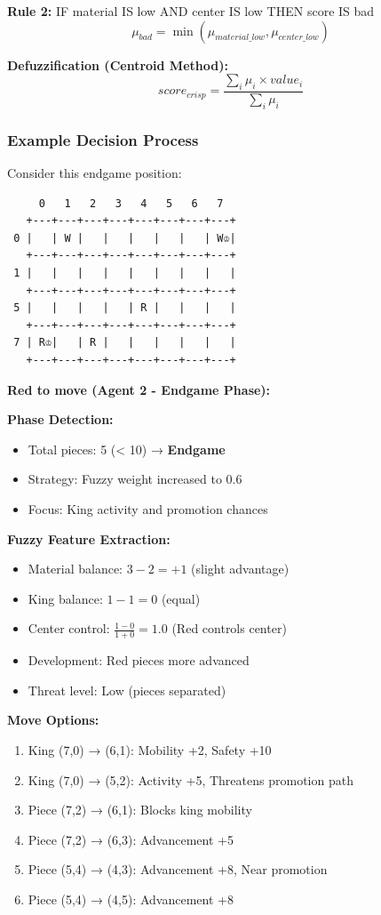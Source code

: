 \documentclass[12pt,a4paper]{article}
\begin{document}
\textbf{Rule 2:} IF material IS low AND center IS low THEN score IS bad
\begin{equation}
\mu_{bad} = \min(\mu_{material\_low}, \mu_{center\_low})
\end{equation}

\textbf{Defuzzification (Centroid Method):}
\begin{equation}
score_{crisp} = \frac{\sum_{i} \mu_i \times value_i}{\sum_{i} \mu_i}
\end{equation}

\subsubsection{Example Decision Process}

Consider this endgame position:

\begin{verbatim}
     0   1   2   3   4   5   6   7
   +---+---+---+---+---+---+---+---+
 0 |   | W |   |   |   |   |   | W♔|
   +---+---+---+---+---+---+---+---+
 1 |   |   |   |   |   |   |   |   |
   +---+---+---+---+---+---+---+---+
 5 |   |   |   |   | R |   |   |   |
   +---+---+---+---+---+---+---+---+
 7 | R♔|   | R |   |   |   |   |   |
   +---+---+---+---+---+---+---+---+
\end{verbatim}

\textbf{Red to move (Agent 2 - Endgame Phase):}

\textbf{Phase Detection:}
\begin{itemize}
    \item Total pieces: 5 (< 10) → \textbf{Endgame}
    \item Strategy: Fuzzy weight increased to 0.6
    \item Focus: King activity and promotion chances
\end{itemize}

\textbf{Fuzzy Feature Extraction:}
\begin{itemize}
    \item Material balance: $3 - 2 = +1$ (slight advantage)
    \item King balance: $1 - 1 = 0$ (equal)
    \item Center control: $\frac{1-0}{1+0} = 1.0$ (Red controls center)
    \item Development: Red pieces more advanced
    \item Threat level: Low (pieces separated)
\end{itemize}

\textbf{Move Options:}
\begin{enumerate}
    \item King (7,0) → (6,1): Mobility +2, Safety +10
    \item King (7,0) → (5,2): Activity +5, Threatens promotion path
    \item Piece (7,2) → (6,1): Blocks king mobility
    \item Piece (7,2) → (6,3): Advancement +5
    \item Piece (5,4) → (4,3): Advancement +8, Near promotion
    \item Piece (5,4) → (4,5): Advancement +8
\end{enumerate}
\end{document}

